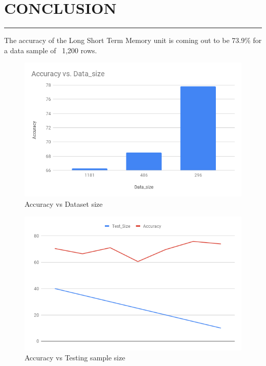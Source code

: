 \documentclass[a4paper,11pt]{article}
\begin{document}
\newpage
\section{CONCLUSION}
\hrule
\vspace*{5mm}
The accuracy of the Long Short Term Memory unit is coming out to be 73.9\% for a data sample of ~1,200 rows.

\begin{figure}[ht]
\includegraphics[width=\linewidth]{x1.png}
\caption{Accuracy vs Dataset size}
\end{figure}


\begin{figure}[!hb]
\includegraphics[width=\linewidth]{1.png}
\caption{Accuracy vs Testing sample size}
\end{figure}
\end{document}
